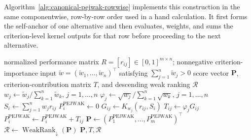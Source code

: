 \documentclass[reqno,11pt]{amsart}
\theoremstyle{definition}
\theoremstyle{plain}
\theoremstyle{remark}
\begin{document}
Algorithm~\ref{alg:canonical-pejwak-rowwise} implements this construction in
the same componentwise, row-by-row order used in a hand calculation. It first
forms the self-anchor of one alternative and then evaluates, weights, and sums
the criterion-level kernel outputs for that row before proceeding to the next
alternative.

\begin{algorithm}[htbp]
\caption{Componentwise row-by-row evaluation of canonical PEJWAK}
\label{alg:canonical-pejwak-rowwise}
\begin{algorithmic}[1]
\Require normalized performance matrix
\(R=[r_{ij}]\in[0,1]^{m\times n}\); nonnegative criterion-importance input
\(\widetilde w=(\widetilde w_1,\ldots,\widetilde w_n)^\top\) satisfying
\(\sum_{j=1}^{n}\widetilde w_j>0\)
\Ensure score vector \(\mathbf P\), criterion-contribution matrix \(T\), and
descending weak ranking \(\mathcal R\)
\State \(w_j\gets\widetilde w_j/\sum_{k=1}^{n}\widetilde w_k\),
\(j=1,\ldots,n\)
\State \(\varphi_j\gets\sqrt{w_j}/\sum_{k=1}^{n}\sqrt{w_k}\),
\(j=1,\ldots,n\)
    \State \(S_i\gets\sum_{j=1}^{n}w_jr_{ij}\)
    \State \(P_i^{\mathrm{PEJWAK}}\gets0\)
        \State \(G_{ij}\gets K_{w_j}(r_{ij},S_i)\)
        \State \(T_{ij}\gets\varphi_jG_{ij}\)
        \State \(P_i^{\mathrm{PEJWAK}}\gets
        P_i^{\mathrm{PEJWAK}}+T_{ij}\)
    \EndFor
\EndFor
\State \(\mathbf P\gets
(P_1^{\mathrm{PEJWAK}},\ldots,P_m^{\mathrm{PEJWAK}})^\top\)
\State \(\mathcal R\gets\operatorname{WeakRank}_{\downarrow}(\mathbf P)\)
\State \Return \(\mathbf P,T,\mathcal R\)
\end{algorithmic}
\end{algorithm}
\end{document}

